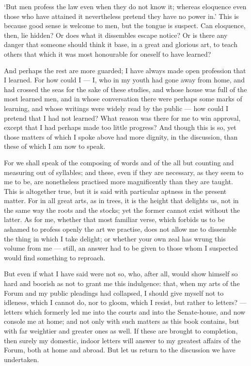  `But men profess the law even when they do not know it; whereas eloquence even those who have attained it nevertheless pretend they have no power in.' This is because good sense is welcome to men, but the tongue is suspect. Can eloquence, then, lie hidden? Or does what it dissembles escape notice? Or is there any danger that someone should think it base, in a great and glorious art, to teach others that which it was most honourable for oneself to have learned?

 And perhaps the rest are more guarded; I have always made open profession that I learned. For how could I — I, who in my youth had gone away from home, and had crossed the seas for the sake of these studies, and whose house was full of the most learned men, and in whose conversation there were perhaps some marks of learning, and whose writings were widely read by the public — how could I pretend that I had not learned? What reason was there for me to win approval, except that I had perhaps made too little progress? And though this is so, yet those matters of which I spoke above had more dignity, in the discussion, than these of which I am now to speak.

 For we shall speak of the composing of words and of the all but counting and measuring out of syllables; and these, even if they are necessary, as they seem to me to be, are nonetheless practised more magnificently than they are taught. This is altogether true, but it is said with particular aptness in the present matter. For in all great arts, as in trees, it is the height that delights us, not in the same way the roots and the stocks; yet the former cannot exist without the latter. As for me, whether that most familiar verse, which forbids us to be ashamed to profess openly the art we practise, does not allow me to dissemble the thing in which I take delight; or whether your own zeal has wrung this volume from me — still, an answer had to be given to those whom I suspected would find something to reproach.

 But even if what I have said were not so, who, after all, would show himself so hard and boorish as not to grant me this indulgence: that, when my arts of the Forum and my public pleadings had collapsed, I should give myself not to idleness, which I cannot do, nor to gloom, which I resist, but rather to letters? — letters which formerly led me into the courts and into the Senate-house, and now console me at home; and not only with such matters as this book contains, but with far weightier and greater ones as well. If these are brought to completion, then surely my domestic, indoor letters will answer to my greatest affairs of the Forum, both at home and abroad. But let us return to the discussion we have undertaken.

